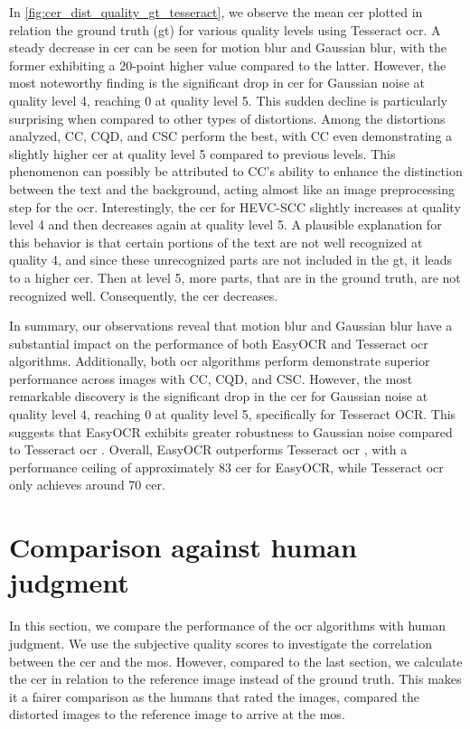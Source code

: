 In \autoref{fig:cer_dist_quality_gt_tesseract}, we observe the mean \gls{cer} plotted in relation the ground truth (\gls{gt}) for various quality levels using Tesseract \gls{ocr}.
A steady decrease in \gls{cer} can be seen for motion blur and Gaussian blur, with the former exhibiting a 20-point higher value compared to the latter.
However, the most noteworthy finding is the significant drop in \gls{cer} for Gaussian noise at quality level 4, reaching 0 at quality level 5.
This sudden decline is particularly surprising when compared to other types of distortions.
Among the distortions analyzed, CC, CQD, and CSC perform the best, with CC even demonstrating a slightly higher \gls{cer} at quality level 5 compared to previous levels.
This phenomenon can possibly be attributed to CC's ability to enhance the distinction between the text and the background, acting almost like an image preprocessing step for the \gls{ocr}.
Interestingly, the \gls{cer} for HEVC-SCC slightly increases at quality level 4 and then decreases again at quality level 5.
A plausible explanation for this behavior is that certain portions of the text are not well recognized at quality 4, and since these unrecognized parts are not included in the \gls{gt}, it leads to a higher \gls{cer}.
Then at level 5, more parts, that are in the ground truth, are not recognized well.
Consequently, the \gls{cer} decreases.

In summary, our observations reveal that motion blur and Gaussian blur have a substantial impact on the performance of both EasyOCR and Tesseract \gls{ocr} algorithms.
Additionally, both \gls{ocr} algorithms perform demonstrate superior performance across images with CC, CQD, and CSC.
However, the most remarkable discovery is the significant drop in the \gls{cer} for Gaussian noise at quality level 4, reaching 0 at quality level 5, specifically for Tesseract OCR.
This suggests that EasyOCR exhibits greater robustness to Gaussian noise compared to Tesseract \gls{ocr} .
Overall, EasyOCR outperforms Tesseract \gls{ocr} , with a performance ceiling of approximately 83 \gls{cer} for EasyOCR, while Tesseract \gls{ocr} only achieves around 70 \gls{cer}.

\section{Comparison against human judgment}
\label{sec:comparison_against_human_judgment}

In this section, we compare the performance of the \gls{ocr} algorithms with human judgment.
We use the subjective quality scores to investigate the correlation between the \gls{cer} and the \gls{mos}.
However, compared to the last section, we calculate the \gls{cer} in relation to the reference image instead of the ground truth.
This makes it a fairer comparison as the humans that rated the images, compared the distorted images to the reference image to arrive at the \gls{mos}.


